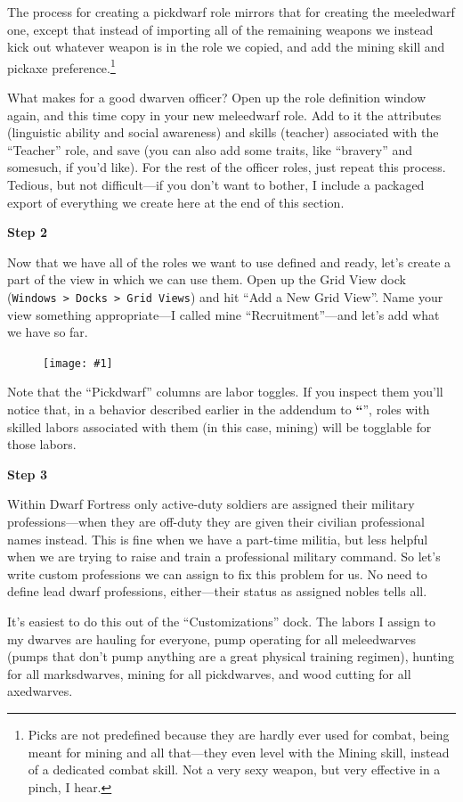 \documentclass[]{article}
\newcommand{\jump}[1] {\textbf{``\nameref{sec:#1}}''}
\newcommand{\step}[1] {
\vspace{12pt}
\noindent \textbf{Step #1}
}
\newcommand{\fullfigure}[1] {
\begin{figure}[h!]
\texttt{[image: \#1]}
\end{figure}
}
\begin{document}
The process for creating a pickdwarf role mirrors that for creating the meeledwarf one, except that
instead of importing all of the remaining weapons we instead kick out whatever weapon is in the role we
copied, and add the mining skill and pickaxe preference.\footnote{Picks are not predefined because they
are hardly ever used for combat, being meant for mining and all that---they even level with the
Mining skill, instead of a dedicated combat skill. Not a very sexy weapon, but very effective in a
pinch, I hear.}

What makes for a good dwarven officer? Open up the role definition window again, and this time copy in
your new meleedwarf role. Add to it the attributes (linguistic ability and social awareness) and skills
(teacher) associated with the ``Teacher'' role, and save (you can also add some traits, like ``bravery''
and somesuch, if you'd like). For the rest of the officer roles, just repeat this process. Tedious, but
not difficult---if you don't want to bother, I include a packaged export of everything we create here at
the end of this section.

\step{2}
Now that we have all of the roles we want to use defined and ready, let's create a part of the
view in which we can use them. Open up the Grid View dock (\texttt{Windows > Docks > Grid Views}) and
hit ``Add a New Grid View''. Name your view something appropriate---I called mine ``Recruitment''---and
let's add what we have so far.

\fullfigure{Sec5Fig2}

Note that the ``Pickdwarf'' columns are labor toggles. If you inspect them you'll notice that, in a
behavior described earlier in the addendum to \jump{Using Roles---The View Method}, roles with skilled
labors associated with them (in this case, mining) will be togglable for those labors.

\step{3}
Within Dwarf Fortress only active-duty soldiers are assigned their military professions---when they are
off-duty they are given their civilian professional names instead. This is fine when we have a part-time
militia, but less helpful when we are trying to raise and train a professional military command. So let's
write custom professions we can assign to fix this problem for us. No need to define lead dwarf
professions, either---their status as assigned nobles tells all.

It's easiest to do this out of the ``Customizations'' dock. The labors I assign to my dwarves are hauling
for everyone, pump operating for all meleedwarves (pumps that don't pump anything are a great physical
training regimen), hunting for all marksdwarves, mining for all pickdwarves, and wood cutting for all
axedwarves.
\end{document}
